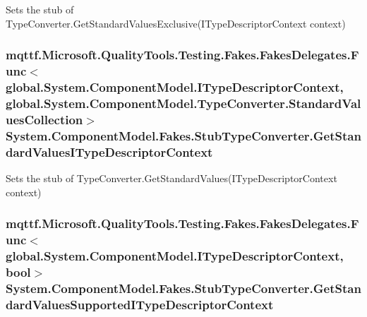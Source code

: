 Sets the stub of Type\-Converter.\-Get\-Standard\-Values\-Exclusive(\-I\-Type\-Descriptor\-Context context)

\hypertarget{class_system_1_1_component_model_1_1_fakes_1_1_stub_type_converter_a268fa82f521320d935c112f7b30b093d}{
\subsubsection[{Get\-Standard\-Values\-I\-Type\-Descriptor\-Context}]{\setlength{\rightskip}{0pt plus 5cm}mqttf.\-Microsoft.\-Quality\-Tools.\-Testing.\-Fakes.\-Fakes\-Delegates.\-Func$<$global.\-System.\-Component\-Model.\-I\-Type\-Descriptor\-Context, global.\-System.\-Component\-Model.\-Type\-Converter.\-Standard\-Values\-Collection$>$ System.\-Component\-Model.\-Fakes.\-Stub\-Type\-Converter.\-Get\-Standard\-Values\-I\-Type\-Descriptor\-Context}}\label{class_system_1_1_component_model_1_1_fakes_1_1_stub_type_converter_a268fa82f521320d935c112f7b30b093d}


Sets the stub of Type\-Converter.\-Get\-Standard\-Values(\-I\-Type\-Descriptor\-Context context)

\hypertarget{class_system_1_1_component_model_1_1_fakes_1_1_stub_type_converter_afe2870a5cb901c63dc98f939fc5f738f}{
\subsubsection[{Get\-Standard\-Values\-Supported\-I\-Type\-Descriptor\-Context}]{\setlength{\rightskip}{0pt plus 5cm}mqttf.\-Microsoft.\-Quality\-Tools.\-Testing.\-Fakes.\-Fakes\-Delegates.\-Func$<$global.\-System.\-Component\-Model.\-I\-Type\-Descriptor\-Context, bool$>$ System.\-Component\-Model.\-Fakes.\-Stub\-Type\-Converter.\-Get\-Standard\-Values\-Supported\-I\-Type\-Descriptor\-Context}}\label{class_system_1_1_component_model_1_1_fakes_1_1_stub_type_converter_afe2870a5cb901c63dc98f939fc5f738f}



